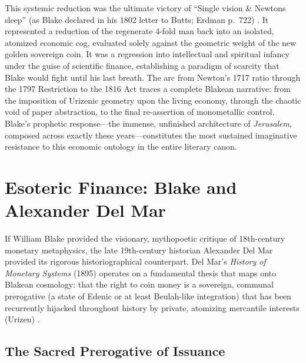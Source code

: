 \documentclass[
]{article}
\begin{document}
This systemic reduction was the ultimate victory of ``Single vision \&
Newtons sleep'' (as Blake declared in his 1802 letter to Butts; Erdman
p.~722) \citep{erdman1988complete}. It represented a reduction of the
regenerate 4-fold man back into an isolated, atomized economic cog,
evaluated solely against the geometric weight of the new golden
sovereign coin. It was a regression into intellectual and spiritual
infancy under the guise of scientific finance, establishing a paradigm
of scarcity that Blake would fight until his last breath. The arc from
Newton's 1717 ratio through the 1797 Restriction to the 1816 Act traces
a complete Blakean narrative: from the imposition of Urizenic geometry
upon the living economy, through the chaotic void of paper abstraction,
to the final re-assertion of monometallic control. Blake's prophetic
response---the immense, unfinished architecture of \emph{Jerusalem},
composed across exactly these years---constitutes the most sustained
imaginative resistance to this economic ontology in the entire literary
canon.

\newpage

\section{Esoteric Finance: Blake and Alexander Del
Mar}\label{esoteric-finance-blake-and-alexander-del-mar}

If William Blake provided the visionary, mythopoetic critique of
18th-century monetary metaphysics, the late 19th-century historian
Alexander Del Mar provided its rigorous historiographical counterpart.
Del Mar's \emph{History of Monetary Systems} (1895) operates on a
fundamental thesis that maps onto Blakean cosmology: that the right to
coin money is a sovereign, communal prerogative (a state of Edenic or at
least Beulah-like integration) that has been recurrently hijacked
throughout history by private, atomizing mercantile interests (Urizen)
\citep{delmar1895history}.

\subsection{The Sacred Prerogative of
Issuance}\label{the-sacred-prerogative-of-issuance}
\end{document}
